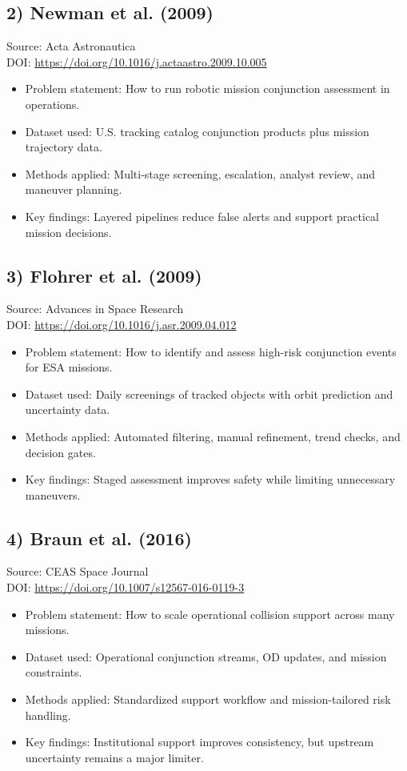 \documentclass[11pt]{article}
\begin{document}
\subsection*{2) Newman et al. (2009)}
Source: Acta Astronautica\\
DOI: \url{https://doi.org/10.1016/j.actaastro.2009.10.005}
\begin{itemize}
\item Problem statement: How to run robotic mission conjunction assessment in operations.
\item Dataset used: U.S. tracking catalog conjunction products plus mission trajectory data.
\item Methods applied: Multi-stage screening, escalation, analyst review, and maneuver planning.
\item Key findings: Layered pipelines reduce false alerts and support practical mission decisions.
\end{itemize}

\subsection*{3) Flohrer et al. (2009)}
Source: Advances in Space Research\\
DOI: \url{https://doi.org/10.1016/j.asr.2009.04.012}
\begin{itemize}
\item Problem statement: How to identify and assess high-risk conjunction events for ESA missions.
\item Dataset used: Daily screenings of tracked objects with orbit prediction and uncertainty data.
\item Methods applied: Automated filtering, manual refinement, trend checks, and decision gates.
\item Key findings: Staged assessment improves safety while limiting unnecessary maneuvers.
\end{itemize}

\subsection*{4) Braun et al. (2016)}
Source: CEAS Space Journal\\
DOI: \url{https://doi.org/10.1007/s12567-016-0119-3}
\begin{itemize}
\item Problem statement: How to scale operational collision support across many missions.
\item Dataset used: Operational conjunction streams, OD updates, and mission constraints.
\item Methods applied: Standardized support workflow and mission-tailored risk handling.
\item Key findings: Institutional support improves consistency, but upstream uncertainty remains a major limiter.
\end{itemize}
\end{document}
